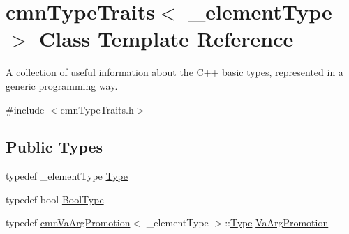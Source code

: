 \hypertarget{classcmn_type_traits}{}\section{cmn\+Type\+Traits$<$ \+\_\+element\+Type $>$ Class Template Reference}
\label{classcmn_type_traits}


A collection of useful information about the C++ basic types, represented in a generic programming way.  




{\ttfamily \#include $<$cmn\+Type\+Traits.\+h$>$}

\subsection*{Public Types}
\begin{DoxyCompactItemize}
\item 
typedef \+\_\+element\+Type \hyperlink{classcmn_type_traits_aefe66f235207b010b396b5558529a1da}{Type}
\item 
typedef bool \hyperlink{classcmn_type_traits_aaa41087228a7f165bcd9f4385e644e28}{Bool\+Type}
\item 
typedef \hyperlink{classcmn_va_arg_promotion}{cmn\+Va\+Arg\+Promotion}$<$ \+\_\+element\+Type $>$\+::\hyperlink{classcmn_type_traits_aefe66f235207b010b396b5558529a1da}{Type} \hyperlink{classcmn_type_traits_a824cf785b2d249f59bf5d9f03c6e8049}{Va\+Arg\+Promotion}
\end{DoxyCompactItemize}
